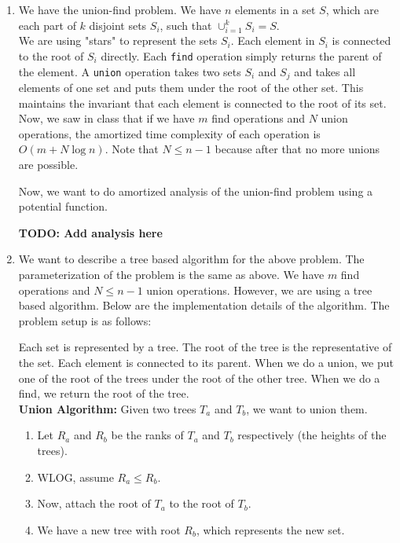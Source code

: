 \documentclass[a4paper]{article}
\begin{document}
\begin{enumerate}
    \item We have the union-find problem. We have $n$ elements in a set $S$, which are each part of $k$ disjoint sets $S_i$, such that $\cup_{i=1}^{k} S_i = S$.\\
    
    We are using "stars" to represent the sets $S_i$. Each element in $S_i$ is connected to the root of $S_i$ directly. Each \texttt{find} operation simply returns the parent of the element. A \texttt{union} operation takes two sets $S_i$ and $S_j$ and takes all elements of one set and puts them under the root of the other set. This maintains the invariant that each element is connected to the root of its set.\\

    Now, we saw in class that if we have $m$ find operations and $N$ union operations, the amortized time complexity of each operation is $O(m + N\log n)$. Note that $N \leq n-1$ because after that no more unions are possible.

    Now, we want to do amortized analysis of the union-find problem using a potential function.

    \textbf{TODO: Add analysis here}

    \newpage
    \item We want to describe a tree based algorithm for the above problem. The parameterization of the problem is the same as above. We have $m$ find operations and $N \leq n-1$ union operations. However, we are using a tree based algorithm. Below are the implementation details of the algorithm. The problem setup is as follows:

    Each set is represented by a tree. The root of the tree is the representative of the set. Each element is connected to its parent. When we do a union, we put one of the root of the trees under the root of the other tree. When we do a find, we return the root of the tree.\\

    \textbf{Union Algorithm:}
    Given two trees $T_a$ and $T_b$, we want to union them.
    \begin{enumerate}[label=\arabic*.]
        \item Let $R_a$ and $R_b$ be the ranks of $T_a$ and $T_b$ respectively (the heights of the trees).
        \item WLOG, assume $R_a \leq R_b$.
        \item Now, attach the root of $T_a$ to the root of $T_b$.
        \item We have a new tree with root $R_b$, which represents the new set.\\
    \end{enumerate}


\end{enumerate}
\end{document}
